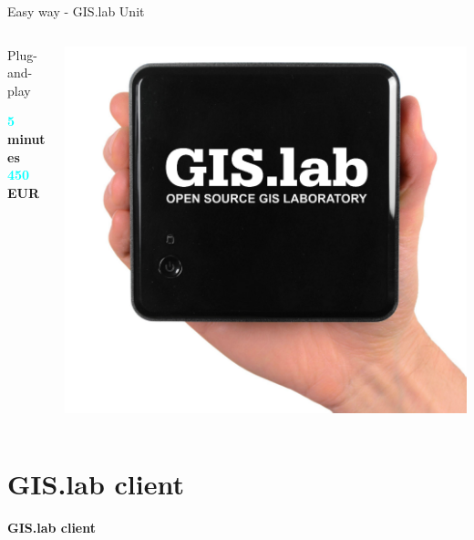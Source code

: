 \documentclass[12pt]{beamer}
\begin{document}
\begin{frame}{Easy way - GIS.lab Unit}
	\begin{minipage}[\textheight]{\textwidth}
	\begin{columns}[T]
		\begin{column}{0.5\textwidth}
			\vspace{0.2\textheight}
			Plug-and-play
			\begin{flushleft}
				\textbf{\textcolor{Cyan}{5} minutes} \\
				\textbf{\textcolor{Cyan}{450} EUR} \\
			\end{flushleft}
		\end{column}
		\begin{column}{0.5\textwidth}
			\includegraphics[keepaspectratio=true,width=\textwidth]{images/gislab-unit.png}
		\end{column}
	\end{columns}
	\end{minipage}
\end{frame}


\section{GIS.lab client}
\begin{frame}
	\begin{center}
		\LARGE\textbf{GIS.lab client}
	\end{center}
\end{frame}
\end{document}
